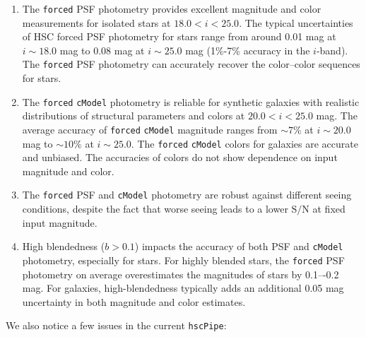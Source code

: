 \documentclass[useamsfonts]{pasj01}
\def\hscpipe{\texttt{hscPipe}}
\def\cmodel{\texttt{cModel}}
\def\forced{\texttt{forced}}
\begin{document}
    \begin{enumerate}

        \item The \forced{} PSF photometry provides excellent magnitude and color
            measurements for isolated stars at $18.0 < i < 25.0$.
            The typical uncertainties of HSC forced PSF photometry for stars range
            from around 0.01 mag at $i{\sim}18.0$ mag to 0.08 mag at $i{\sim}25.0$
            mag (1\%-7\% accuracy in the $i$-band).
            The \forced{} PSF photometry can accurately recover the color--color
            sequences for stars.

        \item The \forced{} \cmodel{} photometry is reliable for synthetic galaxies
            with realistic distributions of structural parameters and colors at
            $20.0 < i < 25.0$ mag.
            The average accuracy of \forced{} \cmodel{} magnitude ranges from
            ${\sim}7$\% at $i{\sim}20.0$ mag to ${\sim}10$\% at $i{\sim}25.0$.
            The \forced{} \cmodel{} colors for galaxies are accurate and unbiased.
            The accuracies of colors do not show dependence on input magnitude and
            color.

        \item The \forced{} PSF and \cmodel{} photometry are robust against different
            seeing conditions, despite the fact that worse seeing leads to a lower
            $\mathrm{S}/\mathrm{N}$ at fixed input magnitude.

        \item High blendedness ($b>0.1$) impacts the accuracy of both PSF and \cmodel{}
            photometry, especially for stars.
            For highly blended stars, the \forced{} PSF photometry on average
            overestimates the magnitudes of stars by 0.1–-0.2 mag.
            For galaxies, high-blendedness typically adds an additional 0.05 mag
            uncertainty in both magnitude and color estimates.

    \end{enumerate}

    We also notice a few issues in the current \hscpipe{}:
\end{document}
